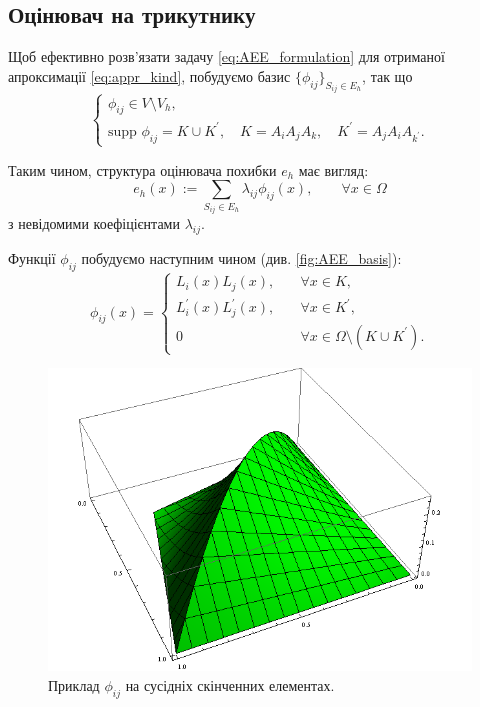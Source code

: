 
\subsection{Оцінювач на трикутнику}

Щоб ефективно розв'язати задачу
\eqref{eq:AEE_formulation} для отриманої апроксимації \eqref{eq:appr_kind}, побудуємо базис $\lbrace \phi_{ij} \rbrace_{S_{ij} \in E_h}$, так що
%
\begin{equation}\label{eq:basis_properties}
\begin{cases}
	\phi_{ij} \in V \setminus V_h, \\
	\text{supp } \phi_{ij} = K \cup K^\prime, \quad K = A_iA_jA_k, \quad K^\prime = A_jA_iA_{k^\prime}.
\end{cases}
\end{equation}

Таким чином, структура оцінювача похибки $e_h$ має вигляд:
%
\begin{equation}
	e_h(x) := \sum \limits_{S_{ij} \in E_h} \lambda_{ij} \phi_{ij}(x), \qquad \forall x \in \Omega
\end{equation}
%
з невідомими коефіцієнтами $\lambda_{ij}$.

Функції $\phi_{ij}$ побудуємо наступним чином (див. \autoref{fig:AEE_basis}):
%
\begin{equation}
	\phi_{ij}(x) =
	\begin{cases}
		L_i(x)L_j(x), &\quad \forall x \in K ,\\
		L_i^\prime(x)L_j^\prime(x), &\quad \forall x \in K^\prime ,\\
		0 &\quad \forall x \in \Omega \setminus (K \cup K^\prime).
	\end{cases}
\end{equation}
%
\begin{figure}[H]
	\centering
    \includegraphics[scale=0.7]{images/basis}
    \caption{Приклад $\phi_{ij}$ на сусідніх скінченних елементах.}
    \label{fig:AEE_basis}
\end{figure}

